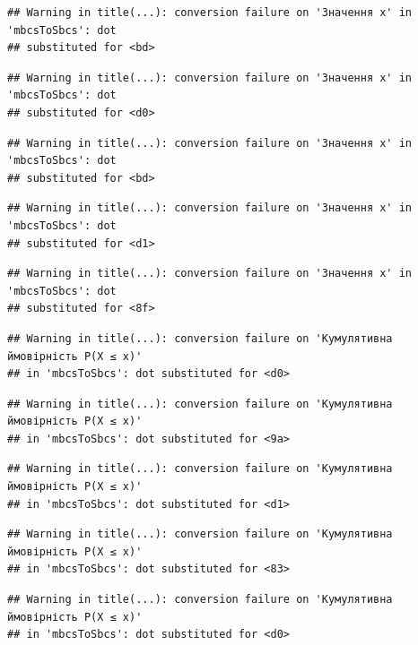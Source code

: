 \documentclass[
  11pt,
]{book}
\begin{document}
\begin{verbatim}
## Warning in title(...): conversion failure on 'Значення x' in 'mbcsToSbcs': dot
## substituted for <bd>
\end{verbatim}

\begin{verbatim}
## Warning in title(...): conversion failure on 'Значення x' in 'mbcsToSbcs': dot
## substituted for <d0>
\end{verbatim}

\begin{verbatim}
## Warning in title(...): conversion failure on 'Значення x' in 'mbcsToSbcs': dot
## substituted for <bd>
\end{verbatim}

\begin{verbatim}
## Warning in title(...): conversion failure on 'Значення x' in 'mbcsToSbcs': dot
## substituted for <d1>
\end{verbatim}

\begin{verbatim}
## Warning in title(...): conversion failure on 'Значення x' in 'mbcsToSbcs': dot
## substituted for <8f>
\end{verbatim}

\begin{verbatim}
## Warning in title(...): conversion failure on 'Кумулятивна ймовірність P(X ≤ x)'
## in 'mbcsToSbcs': dot substituted for <d0>
\end{verbatim}

\begin{verbatim}
## Warning in title(...): conversion failure on 'Кумулятивна ймовірність P(X ≤ x)'
## in 'mbcsToSbcs': dot substituted for <9a>
\end{verbatim}

\begin{verbatim}
## Warning in title(...): conversion failure on 'Кумулятивна ймовірність P(X ≤ x)'
## in 'mbcsToSbcs': dot substituted for <d1>
\end{verbatim}

\begin{verbatim}
## Warning in title(...): conversion failure on 'Кумулятивна ймовірність P(X ≤ x)'
## in 'mbcsToSbcs': dot substituted for <83>
\end{verbatim}

\begin{verbatim}
## Warning in title(...): conversion failure on 'Кумулятивна ймовірність P(X ≤ x)'
## in 'mbcsToSbcs': dot substituted for <d0>
\end{verbatim}
\end{document}

